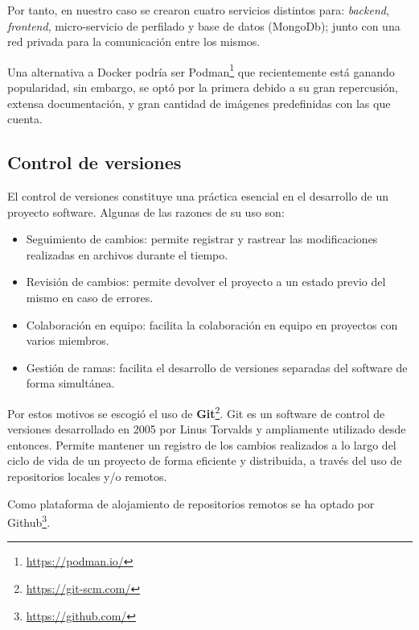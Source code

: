Por tanto, en nuestro caso se crearon cuatro servicios distintos para: \textit{backend}, \textit{frontend}, micro-servicio de perfilado y base de datos (MongoDb); junto con una red privada para la comunicación entre los mismos.

Una alternativa a Docker podría ser Podman\footnote{\url{https://podman.io/}} que recientemente está ganando popularidad, sin embargo, se optó por la primera debido a su gran repercusión, extensa documentación, y gran cantidad de imágenes predefinidas con las que cuenta.

\subsection{Control de versiones}

El control de versiones constituye una práctica esencial en el desarrollo de un proyecto software. Algunas de las razones de su uso son:

\begin{itemize}
    \item Seguimiento de cambios: permite registrar y rastrear las modificaciones realizadas en archivos durante el tiempo.
    \item Revisión de cambios: permite devolver el proyecto a un estado previo del mismo en caso de errores.
    \item Colaboración en equipo: facilita la colaboración en equipo en proyectos con varios miembros.
    \item Gestión de ramas: facilita el desarrollo de versiones separadas del software de forma simultánea.
\end{itemize}

Por estos motivos se escogió el uso de \textbf{Git}\footnote{\url{https://git-scm.com/}}. Git es un software de control de versiones desarrollado en 2005 por Linus Torvalds y ampliamente utilizado desde entonces. Permite mantener un registro de los cambios realizados a lo largo del ciclo de vida de un proyecto de forma eficiente y distribuida, a través del uso de repositorios locales y/o remotos.

Como plataforma de alojamiento de repositorios remotos se ha optado por Github\footnote{\url{https://github.com/}}. %

